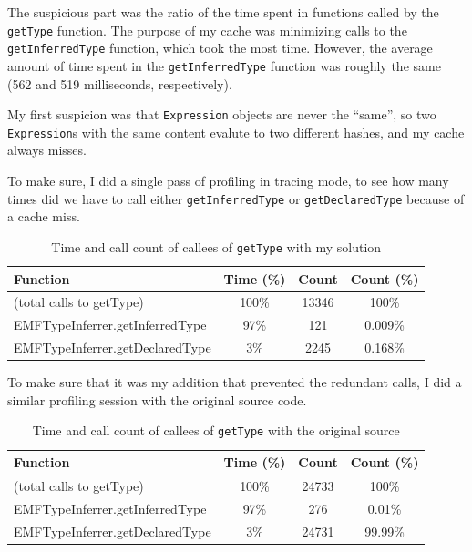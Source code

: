 \documentclass[11pt,a4paper,oneside]{report}
\begin{document}
The suspicious part was the ratio of the time spent in functions called by the
\texttt{getType} function. The purpose of my cache was minimizing calls to the
\texttt{getInferredType} function, which took the most time. However, the
average amount of time spent in the \texttt{getInferredType} function was
roughly the same (562 and 519 milliseconds, respectively).

My first suspicion was that \texttt{Expression} objects are never the ``same'',
so two \texttt{Expression}s with the same content evalute to two different
hashes, and my cache always misses.

To make sure, I did a single pass of profiling in tracing mode, to see how many
times did we have to call either \texttt{getInferredType} or
\texttt{getDeclaredType} because of a cache miss.

\begin{table}[ht]
    \footnotesize
    \centering
    \begin{tabular}{ l c c c }
        \toprule
        Function & Time (\%) & Count & Count (\%) \\
        \midrule
        (total calls to getType) & 100\% & 13346 & 100\% \\
        EMFTypeInferrer.getInferredType & 97\% & 121 & 0.009\% \\
        EMFTypeInferrer.getDeclaredType & 3\% & 2245 & 0.168\% \\
        \bottomrule
    \end{tabular}
    \caption{Time and call count of callees of \texttt{getType} with my solution}
    \label{tab:first-solution-call-counts}
\end{table}

To make sure that it was my addition that prevented the redundant calls, I did a
similar profiling session with the original source code.

\begin{table}[ht]
    \footnotesize
    \centering
    \begin{tabular}{ l c c c }
        \toprule
        Function & Time (\%) & Count & Count (\%) \\
        \midrule
        (total calls to getType) & 100\% & 24733 & 100\% \\
        EMFTypeInferrer.getInferredType & 97\% & 276 & 0.01\% \\
        EMFTypeInferrer.getDeclaredType & 3\% & 24731 & 99.99\% \\
        \bottomrule
    \end{tabular}
    \caption{Time and call count of callees of \texttt{getType} with the original source}
    \label{tab:first-solution-call-counts}
\end{table}
\end{document}
